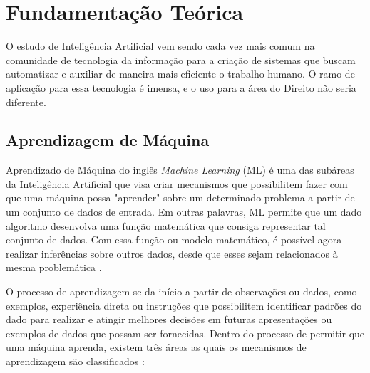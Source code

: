 \chapter[Fundamentação Teórica]{Fundamentação Teórica}

O estudo de Inteligência Artificial vem sendo cada vez mais comum na comunidade de tecnologia da informação para a criação de sistemas que buscam automatizar e auxiliar de maneira mais eficiente o trabalho humano. O ramo de aplicação para essa tecnologia é imensa, e o uso para a área do Direito não seria diferente.

\section{Aprendizagem de Máquina}

Aprendizado de Máquina do inglês \textit{Machine Learning} (ML) é uma das subáreas da Inteligência Artificial que visa criar mecanismos que possibilitem fazer com que uma máquina possa "aprender" sobre um determinado problema a partir de um conjunto de dados de entrada. Em outras palavras, ML permite que um dado algoritmo desenvolva uma função matemática que consiga representar tal conjunto de dados. Com essa função ou modelo matemático, é possível agora realizar inferências sobre outros dados, desde que esses sejam relacionados à mesma problemática \cite{deep-learning-book}.

O processo de aprendizagem se da início a partir de observações ou dados, como exemplos, experiência direta ou instruções que possibilitem identificar padrões do dado para realizar e atingir melhores decisões em futuras apresentações ou exemplos de dados que possam ser fornecidas. Dentro do processo de permitir que uma máquina aprenda, existem três áreas as quais os mecanismos de aprendizagem são classificados \cite{python-ml}:

